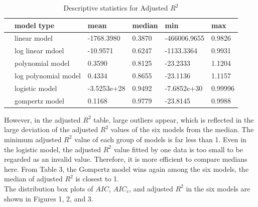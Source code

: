 \documentclass[11pt]{article}
\begin{document}
\begin{table}[H]
\centering
\caption{Descriptive statistics for Adjusted $R^2$}
\begin{tabular}{llllll}
\toprule
 & \textbf{model type} & \textbf{mean}& \textbf{median} & \textbf{min} & \textbf{max}              \\ \toprule
 & linear model         & -1768.3980 & 0.3870 & -466006.9655 & 0.9826 \\
 & log linear mdoel     & -10.9571  & 0.6247 & -1133.3364 & 0.9931 \\
 & polynomial model     & 0.3590 & 0.8125 & -23.2333 & 1.1204 \\
 & log polynomial model & 0.4334  & 0.8655 & -23.1136 & 1.1157 \\
 & logistic model       & -3.5253e+28 & 0.9492 & -7.6852e+30 & 0.99996 \\
 & gompertz model       & 0.1168 & 0.9779 & -23.8145 & 0.9988\\
\bottomrule
\end{tabular}
\end{table}

However, in the adjusted $R^2$ table, large outliers appear, which is reflected in the large deviation of the adjusted $R^2$ values of the six models from the median. The minimum adjusted $R^2$ value of each group of models is far less than 1. Even in the logistic model, the adjusted $R^2$ value fitted by one data is too small to be regarded as an invalid value. Therefore, it is more efficient to compare medians here. From Table 3, the Gompertz model wins again among the six models, the median of adjusted $R^2$ is closest to 1.\\

The distribution box plots of $AIC$, $AIC_c$, and adjusted $R^2$ in the six models are shown in Figures 1, 2, and 3.\\
\end{document}
